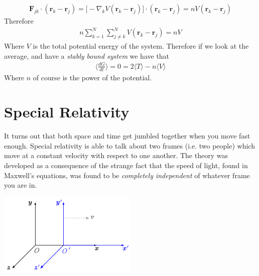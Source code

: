 \begin{align}
\textbf{F}_{jk}\cdot(\textbf{r}_k - \textbf{r}_j) = \Big[-\nabla_k V(\textbf{r}_k - \textbf{r}_j) \Big]\cdot(\textbf{r}_k - \textbf{r}_j) = n V(\textbf{r}_k - \textbf{r}_j) 
\end{align}
Therefore
\begin{align}
n \sum_{k=1}^N \sum_{j\neq k}^N V(\textbf{r}_k - \textbf{r}_j) = nV
\end{align}
Where $V$ is the total potential energy of the system. Therefore if we look at the average, and have a \emph{stably bound system} we have that
\begin{align}
\Big\langle\frac{dG}{dt}\Big\rangle = 0 = 2\langle T \rangle - n\langle V \rangle 
\end{align}
Where $n$ of course is the power of the potential.



\section{Special Relativity}
It turns out that both space and time get jumbled together when you move fast enough. Special relativity is able to talk about two frames (i.e. two people) which move at a constant velocity with respect to one another. The theory was developed as a consequence of the strange fact that the speed of light, found in Maxwell's equations, was found to be \emph{completely independent} of whatever frame you are in. 

\centerline{\includegraphics[width=0.5\textwidth]{physics/images/relativity}}

